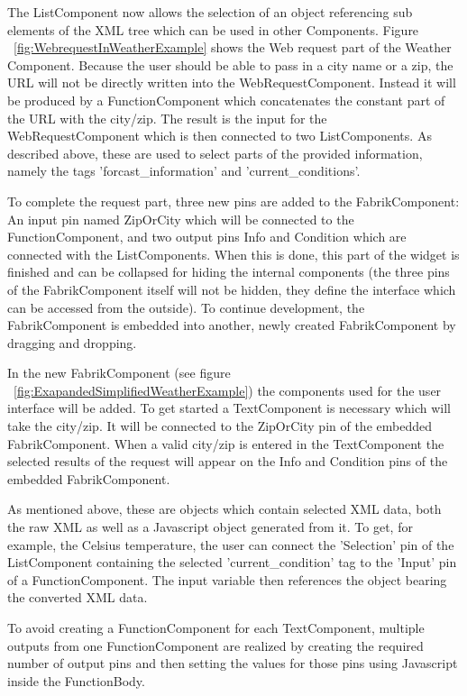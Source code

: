 \documentclass[pdftex, times, 10pt, twocolumn]{article}
\begin{document}
The ListComponent now allows the selection of an object referencing sub elements of the XML tree which can be used in other Components. Figure ~\ref{fig:WebrequestInWeatherExample} shows the Web request part of the Weather Component. Because the user should be able to pass in a city name or a zip, the URL will not be directly written into the WebRequestComponent. Instead it will be produced by a FunctionComponent which concatenates the constant part of the URL with the city/zip. The result is the input for the WebRequestComponent which is then connected to two ListComponents. As described above, these are used to select parts of the provided information, namely the tags 'forcast\_information' and 'current\_conditions'. 

To complete the request part, three new pins are added to the FabrikComponent: An input pin named ZipOrCity which will be connected to the FunctionComponent, and two output pins Info and Condition which are connected with the ListComponents. When this is done, this part of the widget is finished and can be collapsed for hiding the internal components (the three pins of the FabrikComponent itself will not be hidden, they define the interface which can be accessed from the outside). To continue development, the FabrikComponent is embedded into another, newly created FabrikComponent by dragging and dropping. 

In the new FabrikComponent (see figure ~\ref{fig:ExapandedSimplifiedWeatherExample}) the components used for the user interface will be added. To get started a TextComponent is necessary which will take the city/zip. It will be connected to the ZipOrCity pin of the embedded FabrikComponent. When a valid city/zip is entered in the TextComponent the selected results of the request will appear on the Info and Condition pins of the embedded FabrikComponent. 

As mentioned above, these are objects which contain selected XML data, both the raw XML as well as a Javascript object generated from it. To get, for example, the Celsius temperature, the user can connect the 'Selection' pin of the ListComponent containing the selected 'current\_condition' tag to the 'Input' pin of a FunctionComponent. The input variable then references the object bearing the converted XML data.  

To avoid creating a FunctionComponent for each TextComponent, multiple outputs from one FunctionComponent are realized by creating the required number of output pins and then setting the values for those  pins using Javascript inside the FunctionBody. 
\end{document}

